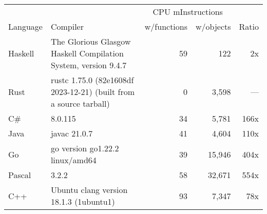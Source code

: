 \documentclass{article}
\begin{document}
      \begin{tabularx}{\linewidth}{lXrrr}
      \toprule
        & & \multicolumn{2}{c}{CPU mInstructions} & \\
        Language & Compiler & w/functions & w/objects & Ratio \\
      \midrule
    Haskell & The Glorious Glasgow Haskell Compilation System, version 9.4.7 & 59 & 122 & 2x \\
Rust & rustc 1.75.0 (82e1608df 2023-12-21) (built from a source tarball) & 0 & 3,598 & --- \\
C\# & 8.0.115 & 34 & 5,781 & 166x \\
Java & javac 21.0.7 & 41 & 4,604 & 110x \\
Go & go version go1.22.2 linux/amd64 & 39 & 15,946 & 404x \\
Pascal & 3.2.2 & 58 & 32,671 & 554x \\
C++ & Ubuntu clang version 18.1.3 (1ubuntu1) & 93 & 7,347 & 78x \\

      \bottomrule
      \end{tabularx}
      
\end{document}
